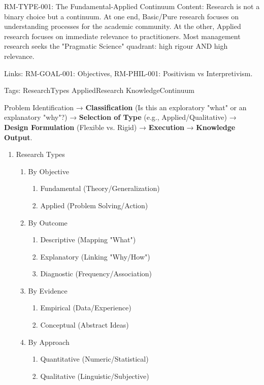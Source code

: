 \documentclass{report}
\begin{document}
\begin{zettelkasteinnotes}
    RM-TYPE-001: The Fundamental-Applied Continuum Content: Research is not a binary choice but a continuum. At one end, Basic/Pure research focuses on understanding processes for the academic community. At the other, Applied research focuses on immediate relevance to practitioners. Most management research seeks the "Pragmatic Science" quadrant: high rigour AND high relevance. 
    
    Links: RM-GOAL-001: Objectives, RM-PHIL-001: Positivism vs Interpretivism. 
    
    Tags: ResearchTypes AppliedResearch KnowledgeContinuum
\end{zettelkasteinnotes}

\begin{flownotes}
    Problem Identification → \textbf{Classification} (Is this an exploratory "what" or an explanatory "why"?) → \textbf{Selection of Type} (e.g., Applied/Qualitative) → \textbf{Design Formulation} (Flexible vs. Rigid) → \textbf{Execution} → \textbf{Knowledge Output}.
\end{flownotes}

\begin{mindmaps}
    \begin{enumerate}
        \item Research Types
        \begin{enumerate}
            \item By Objective
            \begin{enumerate}
                \item Fundamental (Theory/Generalization)
                \item Applied (Problem Solving/Action)
            \end{enumerate}
            \item By Outcome
            \begin{enumerate}
                \item Descriptive (Mapping "What")
                \item Explanatory (Linking "Why/How")
                \item Diagnostic (Frequency/Association)
            \end{enumerate}
            \item By Evidence
            \begin{enumerate}
                \item Empirical (Data/Experience)
                \item Conceptual (Abstract Ideas)
            \end{enumerate}
            \item By Approach
            \begin{enumerate}
                \item Quantitative (Numeric/Statistical)
                \item Qualitative (Linguistic/Subjective)
            \end{enumerate}
        \end{enumerate}
    \end{enumerate}
\end{mindmaps}
\end{document}
